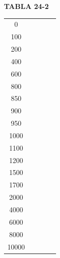 \documentclass{article}
\begin{document}
\begin{center}
    \textbf{TABLA 24-2}
\end{center}

\centering
\begin{tabular}{
    S[table-format=5.0]
    S[table-format=5.0]
    S[table-format=1.3]
    S[table-format=2.3]
    S[table-format=2.3]
}
\toprule
{} &
{} &
{} &
{} &
{} \\
 & & & & \\
100 & & & & \\
200 & & & & \\
400 & & & & \\
600 & & & & \\
800 & & & & \\
850 & & & & \\
900 & & & & \\
950 & & & & \\
1000 & & & & \\
1100 & & & & \\
1200 & & & & \\
1500 & & & & \\
1700 & & & & \\
2000 & & & & \\
4000 & & & & \\
6000 & & & & \\
8000 & & & & \\
10000 & & & & \\
\bottomrule
\end{tabular}
\end{document}

